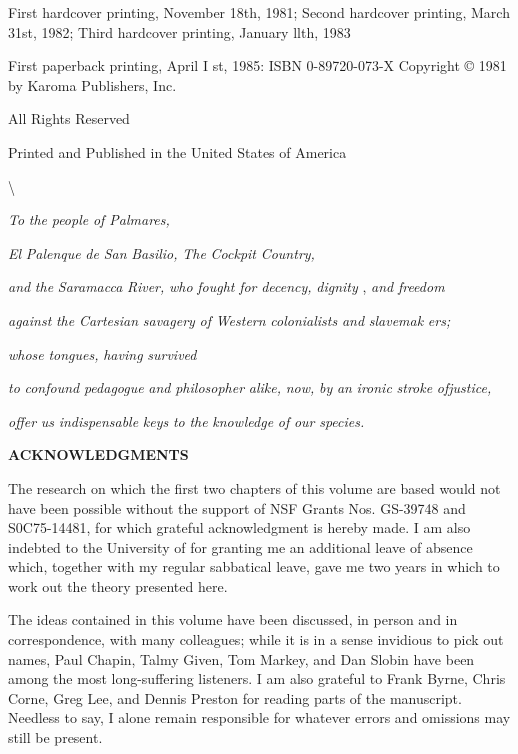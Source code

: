 

First hardcover printing, November 18th, 1981; Second hardcover printing, March 31st, 1982; Third hardcover printing, January llth, 1983

First paperback printing, April I st, 1985: ISBN 0-89720-073-X Copyright © 1981 by Karoma Publishers, Inc.

All Rights Reserved

Printed and Published in the United States of America

{\textbackslash}

\textit{To} \textit{the} \textit{people} \textit{of Palmares,}

\textit{El} \textit{Palenque} \textit{d}\textit{e} \textit{San} \textit{Basilio,} \textit{The} \textit{Cockpit} \textit{Country,}

\textit{and} \textit{the} \textit{Saramacca} \textit{River,} \textit{who} \textit{fought} \textit{for} \textit{decency,} \textit{dignity} , \textit{and} \textit{freedom}

\textit{against} \textit{the} \textit{Cartesian} \textit{savagery} \textit{of} \textit{Western} \textit{colonialists} \textit{and} \textit{slavemak} \textit{ers;}

\textit{whose} \textit{tongues,} \textit{having} \textit{survived}

\textit{to} \textit{confound} \textit{pedagogue} \textit{and} \textit{philosopher} \textit{alike,} \textit{now,} \textit{by} \textit{an} \textit{ironic} \textit{stroke} \textit{ofjustice,}

\textit{offer} \textit{us} \textit{indispensable} \textit{keys} \textit{to} \textit{the} \textit{knowledge} \textit{of} \textit{our} \textit{species.}

\bfseries
\hypertarget{TOC250001}{}ACKNOWLEDGMENTS

The research on which the first two chapters of this volume are based would not have been possible without the support of NSF Grants Nos. GS-39748 and S0C75-14481, for which grateful acknowledgment is hereby made. I am also indebted to the University of  for granting me an additional leave of absence which, together with my regular sabbatical leave, gave me two years in which to work out the theory presented here.

The ideas contained in this volume have been discussed, in person and in correspondence, with many colleagues; while it is in a sense in\-vidious to pick out names, Paul Chapin, Talmy Given, Tom Markey, and Dan Slobin have been among the most long-suffering listeners. I am also grateful to Frank Byrne, Chris Corne, Greg Lee, and Dennis Pres\-ton for reading parts of the manuscript. Needless to say, I alone remain responsible for whatever errors and omissions may still be present.

